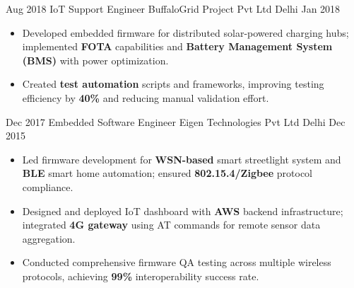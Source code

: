 \begin{experiences}
\experience
  {Aug 2018}   %
  {IoT Support Engineer}  %
  {BuffaloGrid Project Pvt Ltd}  %
  {Delhi}  %
  {Jan 2018}  %
  {   %
      \begin{itemize}
          \item Developed embedded firmware for distributed solar-powered charging hubs; implemented \textbf{FOTA} capabilities and \textbf{Battery Management System (BMS)} with power optimization.
          \item Created \textbf{test automation} scripts and frameworks, improving testing efficiency by \textbf{40\%} and reducing manual validation effort.
      \end{itemize}    
  }
  {}

  \experience
  {Dec 2017}   %
  {Embedded Software Engineer}  %
  {Eigen Technologies Pvt Ltd}  %
  {Delhi}  %
  {Dec 2015}  %
  {   %
      \begin{itemize}
          \item Led firmware development for \textbf{WSN-based} smart streetlight system and \textbf{BLE} smart home automation; ensured \textbf{802.15.4/Zigbee} protocol compliance.
          \item Designed and deployed IoT dashboard with \textbf{AWS} backend infrastructure; integrated \textbf{4G gateway} using AT commands for remote sensor data aggregation.
          \item Conducted comprehensive firmware QA testing across multiple wireless protocols, achieving \textbf{99\%} interoperability success rate.
      \end{itemize}    
  }
  {}


    
\end{experiences}
